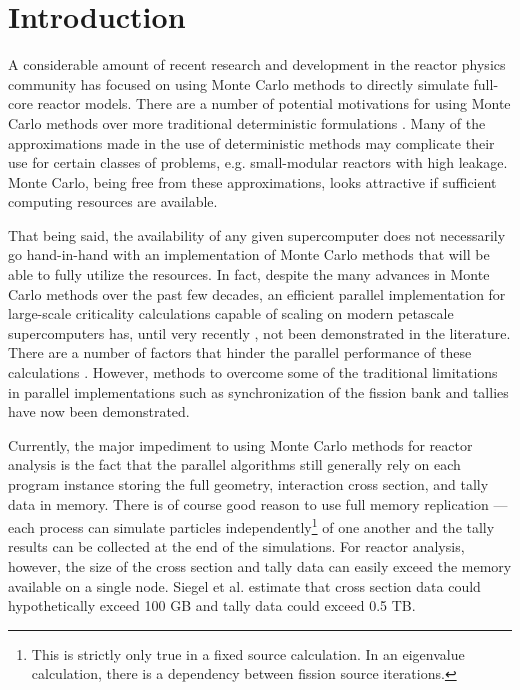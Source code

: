 \documentclass[3p]{elsarticle}
\begin{document}
\section{Introduction}

A considerable amount of recent research and development in the reactor physics
community has focused on using Monte Carlo methods to directly simulate
full-core reactor models. There are a number of potential motivations for using
Monte Carlo methods over more traditional deterministic formulations
\cite{jnet-martin-2012, jcp-siegel-2012-2}. Many of the approximations made in
the use of deterministic methods may complicate their use for certain classes of
problems, e.g. small-modular reactors with high leakage. Monte Carlo, being free
from these approximations, looks attractive if sufficient computing resources
are available.

That being said, the availability of any given supercomputer does not
necessarily go hand-in-hand with an implementation of Monte Carlo methods that
will be able to fully utilize the resources. In fact, despite the many advances
in Monte Carlo methods over the past few decades, an efficient parallel
implementation for large-scale criticality calculations capable of scaling on
modern petascale supercomputers has, until very recently \cite{ane-romano-2012},
not been demonstrated in the literature. There are a number of factors that
hinder the parallel performance of these calculations \cite{jnet-martin-2012,
  pnst-brown-2011}. However, methods to overcome some of the traditional
limitations in parallel implementations such as synchronization of the fission
bank \cite{nse-romano-2012, ane-romano-2012} and tallies
\cite{trans-romano-2012} have now been demonstrated.

Currently, the major impediment to using Monte Carlo methods for reactor
analysis is the fact that the parallel algorithms still generally rely on each
program instance storing the full geometry, interaction cross section, and tally
data in memory. There is of course good reason to use full memory replication
--- each process can simulate particles independently\footnote{This is strictly
  only true in a fixed source calculation. In an eigenvalue calculation, there
  is a dependency between fission source iterations.} of one another and the
tally results can be collected at the end of the simulations. For reactor
analysis, however, the size of the cross section and tally data can easily
exceed the memory available on a single node. Siegel et
al. \cite{jcp-siegel-2012-2} estimate that cross section data could
hypothetically exceed 100 GB and tally data could exceed 0.5 TB.
\end{document}
